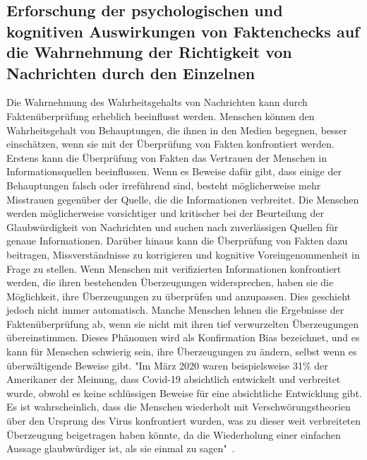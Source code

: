 \documentclass[a4paper,listof=totoc,bibliography=totoc]{scrartcl}
\begin{document}
\subsection{Erforschung der psychologischen und kognitiven Auswirkungen von Faktenchecks auf die Wahrnehmung der Richtigkeit von Nachrichten durch den Einzelnen} 
Die Wahrnehmung des Wahrheitsgehalts von Nachrichten kann durch Faktenüberprüfung erheblich beeinflusst werden. Menschen können den Wahrheitsgehalt von Behauptungen, die 
ihnen in den Medien begegnen, besser einschätzen, wenn sie mit der Überprüfung von Fakten konfrontiert werden. Erstens kann die Überprüfung von Fakten das Vertrauen der 
Menschen in Informationsquellen beeinflussen. Wenn es Beweise dafür gibt, dass einige der Behauptungen falsch oder irreführend sind, besteht möglicherweise mehr Misstrauen 
gegenüber der Quelle, die die Informationen verbreitet. Die Menschen werden möglicherweise vorsichtiger und kritischer bei der Beurteilung der Glaubwürdigkeit von Nachrichten 
und suchen nach zuverlässigen Quellen für genaue Informationen. Darüber hinaus kann die Überprüfung von Fakten dazu beitragen, Missverständnisse zu korrigieren und kognitive 
Voreingenommenheit in Frage zu stellen. Wenn Menschen mit verifizierten Informationen konfrontiert werden, die ihren bestehenden Überzeugungen widersprechen, haben sie die 
Möglichkeit, ihre Überzeugungen zu überprüfen und anzupassen. Dies geschieht jedoch nicht immer automatisch. Manche Menschen lehnen die Ergebnisse der Faktenüberprüfung ab, 
wenn sie nicht mit ihren tief verwurzelten Überzeugungen übereinstimmen. Dieses Phänomen wird als Konfirmation Bias bezeichnet, und es kann für Menschen schwierig sein, ihre 
Überzeugungen zu ändern, selbst wenn es überwältigende Beweise gibt. "Im März 2020 waren beispielsweise 31\% der Amerikaner der Meinung, dass Covid-19 absichtlich entwickelt 
und verbreitet wurde, obwohl es keine schlüssigen Beweise für eine absichtliche Entwicklung gibt. Es ist wahrscheinlich, dass die Menschen wiederholt mit Verschwörungstheorien 
über den Ursprung des Virus konfrontiert wurden, was zu dieser weit verbreiteten Überzeugung beigetragen haben könnte, da die Wiederholung einer einfachen Aussage glaubwürdiger 
ist, als sie einmal zu sagen"~\cite{K.H.Ecker:2022}.\newline
\end{document}
